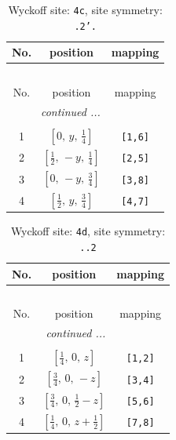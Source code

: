 \documentclass[fleqn,8pt]{jsarticle}
\begin{document}
\renewcommand{\arraystretch}{1.2}
\begin{longtable}{ccc}
\caption{Wyckoff site: {\tt 4c}, site symmetry: {\tt .2'.}}
 \\
 \hline \hline
No. & position & mapping \\ \hline \endfirsthead

\multicolumn{2}{l}{\tablename\ \thetable{}} \\
 \hline \hline
No. & position & mapping \\ \hline \endhead

 \hline \hline
\multicolumn{2}{r}{\footnotesize\it continued ...} \\ \endfoot

 \hline \hline
\multicolumn{2}{r}{} \\ \endlastfoot

1 & $\left[ 0,\, y,\, \frac{1}{4} \right]$ & {\tt [1,6]} \\ \hline
2 & $\left[ \frac{1}{2},\, - y,\, \frac{1}{4} \right]$ & {\tt [2,5]} \\ \hline
3 & $\left[ 0,\, - y,\, \frac{3}{4} \right]$ & {\tt [3,8]} \\ \hline
4 & $\left[ \frac{1}{2},\, y,\, \frac{3}{4} \right]$ & {\tt [4,7]} \\
\end{longtable}
\renewcommand{\arraystretch}{1.2}
\begin{longtable}{ccc}
\caption{Wyckoff site: {\tt 4d}, site symmetry: {\tt ..2}}
 \\
 \hline \hline
No. & position & mapping \\ \hline \endfirsthead

\multicolumn{2}{l}{\tablename\ \thetable{}} \\
 \hline \hline
No. & position & mapping \\ \hline \endhead

 \hline \hline
\multicolumn{2}{r}{\footnotesize\it continued ...} \\ \endfoot

 \hline \hline
\multicolumn{2}{r}{} \\ \endlastfoot

1 & $\left[ \frac{1}{4},\, 0,\, z \right]$ & {\tt [1,2]} \\ \hline
2 & $\left[ \frac{3}{4},\, 0,\, - z \right]$ & {\tt [3,4]} \\ \hline
3 & $\left[ \frac{3}{4},\, 0,\, \frac{1}{2} - z \right]$ & {\tt [5,6]} \\ \hline
4 & $\left[ \frac{1}{4},\, 0,\, z + \frac{1}{2} \right]$ & {\tt [7,8]} \\
\end{longtable}
\end{document}
